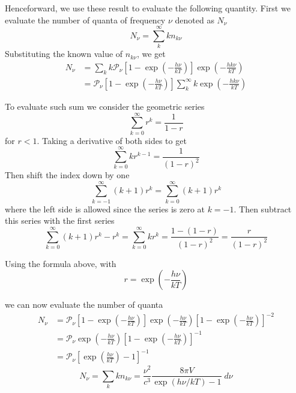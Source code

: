 \documentclass[../../../Main.tex]{subfiles}
\begin{document}
Henceforward, we use these result to evaluate the following quantity. First we evaluate the number of quanta of frequency $\nu$ denoted as $N_\nu$
\begin{equation*}
    N_\nu=\sum_k^{\infty} kn_{k\nu}
\end{equation*}
Substituting the known value of $n_{k\nu}$, we get 
\begin{align*}
    N_\nu&=\sum_k k \mathcal{P}_\nu\left[1-\exp\left(-\frac{h\nu}{k T}\right)\right]\exp\left(-\frac{hk\nu}{k T}\right)\\
    &=\mathcal{P}_\nu\left[1-\exp\left(-\frac{h\nu}{k T}\right)\right] \sum_k^{\infty} k \exp\left(-\frac{hk\nu}{k T}\right)
\end{align*}

To evaluate such sum we consider the geometric series
\begin{equation*}
    \sum_{k=0}^{\infty}r^{k}=\frac{1}{1-r}
\end{equation*}
for $r<1$. Taking a derivative of both sides to get
\begin{equation*}
    \sum_{k=0}^{\infty}kr^{k-1}=\frac{1}{(1-r)^2}
\end{equation*}
Then shift the index down by one 
\begin{equation*}
    \sum_{k=-1}^{\infty}(k+1)r^{k}=\sum_{k=0}^{\infty}(k+1)r^{k}
\end{equation*}
where the left side is allowed since the series is zero at $k=-1$. Then subtract this series with the first series
\begin{equation*}
    \sum_{k=0}^{\infty}(k+1)r^{k}-r^k=\sum_{k=0}^{\infty} kr^k=\frac{1-(1-r)}{(1-r)^2}=\frac{r}{(1-r)^2}
\end{equation*}

Using the formula above, with 
\begin{equation*}
    r=\exp\left(-\frac{h\nu}{k T}\right)
\end{equation*}

we can now evaluate the number of quanta
\begin{align*}
    N_\nu&=\mathcal{P}_\nu\left[1-\exp\left(-\frac{h\nu}{k T}\right) \right]\exp\left(-\frac{h\nu}{k T}\right)\left[1-\exp\left(-\frac{h\nu}{k T}\right)\right]^{-2}\\
    &=\mathcal{P}_\nu\exp\left(-\frac{h\nu}{k T}\right)\left[1-\exp\left(-\frac{h\nu}{k T}\right)\right]^{-1}\\
    &=\mathcal{P}_\nu\left[\exp\left(\frac{h\nu}{k T}\right)-1 \right]^{-1}
\end{align*}
\begin{equation*}
    N_\nu=\sum_k kn_{k\nu}=\frac{\nu^2}{c^3}\frac{8\pi V}{\exp(h\nu/k T)-1}\;d\nu
\end{equation*}
\end{document}
